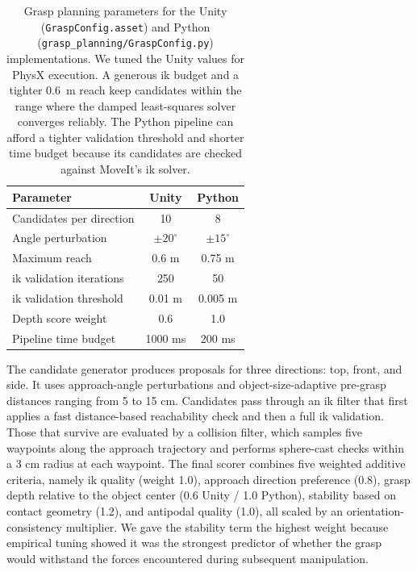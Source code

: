 \begin{table}[t]
	\centering
	\begin{tabular}{lcc}
		\hline
		\textbf{Parameter}             & \textbf{Unity} & \textbf{Python} \\
		\hline
		Candidates per direction       & 10             & 8               \\
		Angle perturbation             & $\pm20^\circ$  & $\pm15^\circ$   \\
		Maximum reach                  & 0.6 m          & 0.75 m          \\
		\gls{ik} validation iterations & 250            & 50              \\
		\gls{ik} validation threshold  & 0.01 m         & 0.005 m         \\
		Depth score weight             & 0.6            & 1.0             \\
		Pipeline time budget           & 1000 ms        & 200 ms          \\
		\hline
	\end{tabular}
	\caption{Grasp planning parameters for the Unity (\texttt{GraspConfig.asset}) and Python (\texttt{grasp\_planning/GraspConfig.py}) implementations. We tuned the Unity values for PhysX execution. A generous \gls{ik} budget and a tighter 0.6~m reach keep candidates within the range where the damped least-squares solver converges reliably. The Python pipeline can afford a tighter validation threshold and shorter time budget because its candidates are checked against MoveIt’s \gls{ik} solver.}
	\label{tab:grasp_params}
\end{table}

The candidate generator produces proposals for three directions: top, front, and side. It uses approach-angle perturbations and object-size-adaptive pre-grasp distances ranging from 5 to 15 cm. Candidates pass through an \gls{ik} filter that first applies a fast distance-based reachability check and then a full \gls{ik} validation. Those that survive are evaluated by a collision filter, which samples five waypoints along the approach trajectory and performs sphere-cast checks within a 3 cm radius at each waypoint. The final scorer combines five weighted additive criteria, namely \gls{ik} quality (weight 1.0), approach direction preference (0.8), grasp depth relative to the object center (0.6 Unity / 1.0 Python), stability based on contact geometry (1.2), and antipodal quality (1.0), all scaled by an orientation-consistency multiplier. We gave the stability term the highest weight because empirical tuning showed it was the strongest predictor of whether the grasp would withstand the forces encountered during subsequent manipulation.

